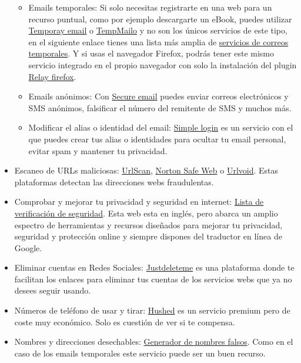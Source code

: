 \documentclass[
  a4paper,
  openany]{book}
\begin{document}
\begin{itemize}
  \begin{itemize}
  \item
    Emails temporales: Si solo necesitas registrarte en una web para un recurso puntual, como por ejemplo descargarte un eBook, puedes utilizar \href{https://temp-mail.org/es/}{Temporay email} o \href{https://tempmailo.com/}{TempMailo} y no son los únicos servicios de este tipo, en el siguiente enlace tienes una lista más amplia de \href{https://www.genbeta.com/correo/7-servicios-de-email-temporales-para-evitar-spam-y-otros-problemas}{servicios de correos temporales}. Y si usas el navegador Firefox, podrás tener este mismo servicio integrado en el propio navegador con solo la instalación del plugin \href{https://relay.firefox.com}{Relay firefox}.
  \item
    Emails anónimos: Con \href{https://www.secure-email.org/index.php}{Secure email} puedes enviar correos electrónicos y SMS anónimos, falsificar el número del remitente de SMS y muchos más.
  \item
    Modificar el alias o identidad del email: \href{https://simplelogin.io/}{Simple login} es un servicio con el que puedes crear tus alias o identidades para ocultar tu email personal, evitar spam y mantener tu privacidad.
  \end{itemize}
\item
  Escaneo de URLs maliciosas: \href{https://urlscan.io/}{UrlScan}, \href{https://safeweb.norton.com/}{Norton Safe Web} o \href{https://www.urlvoid.com/}{Urlvoid}. Estas plataformas detectan las direcciones webs fraudulentas.
\item
  Comprobar y mejorar tu privacidad y seguridad en internet: \href{https://securitycheckli.st/}{Lista de verificación de seguridad}. Esta web esta en inglés, pero abarca un amplio espectro de herramientas y recursos diseñados para mejorar tu privacidad, seguridad y protección online y siempre dispones del traductor en línea de Google.
\item
  Eliminar cuentas en Redes Sociales: \href{https://backgroundchecks.org/justdeleteme/}{Justdeleteme} es una plataforma donde te facilitan los enlaces para eliminar tus cuentas de los servicios webs que ya no desees seguir usando.
\item
  Números de teléfono de usar y tirar: \href{https://hushed.com}{Hushed} es un servicio premium pero de coste muy económico. Solo es cuestión de ver si te compensa.
\item
  Nombres y direcciones desechables: \href{https://www.fakenamegenerator.com}{Generador de nombres falsos}. Como en el caso de los emails temporales este servicio puede ser un buen recurso.

\end{itemize}
\end{document}
